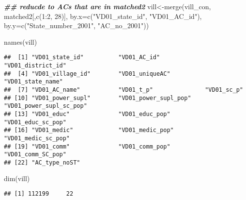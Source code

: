\documentclass[
]{article}
\newenvironment{Shaded}{\begin{snugshade}}{\end{snugshade}}
\newcommand{\AttributeTok}[1]{\textcolor[rgb]{0.77,0.63,0.00}{#1}}
\newcommand{\DecValTok}[1]{\textcolor[rgb]{0.00,0.00,0.81}{#1}}
\newcommand{\DocumentationTok}[1]{\textcolor[rgb]{0.56,0.35,0.01}{\textbf{\textit{#1}}}}
\newcommand{\FunctionTok}[1]{\textcolor[rgb]{0.00,0.00,0.00}{#1}}
\newcommand{\NormalTok}[1]{#1}
\newcommand{\OtherTok}[1]{\textcolor[rgb]{0.56,0.35,0.01}{#1}}
\newcommand{\SpecialCharTok}[1]{\textcolor[rgb]{0.00,0.00,0.00}{#1}}
\newcommand{\StringTok}[1]{\textcolor[rgb]{0.31,0.60,0.02}{#1}}
\begin{document}
\begin{Shaded}
\begin{Highlighting}[]
\DocumentationTok{\#\# reducde to ACs that are in matched2}
\NormalTok{vill}\OtherTok{\textless{}{-}}\FunctionTok{merge}\NormalTok{(vill\_con, matched2[,}\FunctionTok{c}\NormalTok{(}\DecValTok{1}\SpecialCharTok{:}\DecValTok{2}\NormalTok{, }\DecValTok{28}\NormalTok{)], }\AttributeTok{by.x=}\FunctionTok{c}\NormalTok{(}\StringTok{"VD01\_state\_id"}\NormalTok{, }\StringTok{"VD01\_AC\_id"}\NormalTok{), }\AttributeTok{by.y=}\FunctionTok{c}\NormalTok{(}\StringTok{"State\_number\_2001"}\NormalTok{, }\StringTok{"AC\_no\_2001"}\NormalTok{))}

\FunctionTok{names}\NormalTok{(vill)}
\end{Highlighting}
\end{Shaded}

\begin{verbatim}
##  [1] "VD01_state_id"          "VD01_AC_id"             "VD01_district_id"      
##  [4] "VD01_village_id"        "VD01_uniqueAC"          "VD01_state_name"       
##  [7] "VD01_AC_name"           "VD01_t_p"               "VD01_sc_p"             
## [10] "VD01_power_supl"        "VD01_power_supl_pop"    "VD01_power_supl_sc_pop"
## [13] "VD01_educ"              "VD01_educ_pop"          "VD01_educ_sc_pop"      
## [16] "VD01_medic"             "VD01_medic_pop"         "VD01_medic_sc_pop"     
## [19] "VD01_comm"              "VD01_comm_pop"          "VD01_comm_SC_pop"      
## [22] "AC_type_noST"
\end{verbatim}

\begin{Shaded}
\begin{Highlighting}[]
\FunctionTok{dim}\NormalTok{(vill)}
\end{Highlighting}
\end{Shaded}

\begin{verbatim}
## [1] 112199     22
\end{verbatim}
\end{document}
